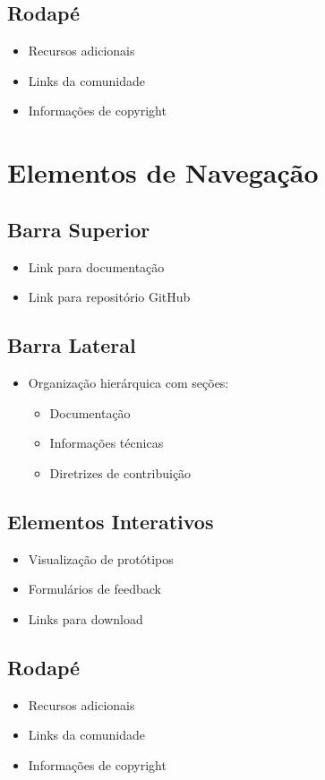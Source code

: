 \subsection{Rodapé}
\begin{itemize}
    \item Recursos adicionais
    \item Links da comunidade
    \item Informações de copyright
\end{itemize}

\section{Elementos de Navegação}

\subsection{Barra Superior}
\begin{itemize}
    \item Link para documentação
    \item Link para repositório GitHub
\end{itemize}

\subsection{Barra Lateral}
\begin{itemize}
    \item Organização hierárquica com seções:
    \begin{itemize}
        \item Documentação
        \item Informações técnicas
        \item Diretrizes de contribuição
    \end{itemize}
\end{itemize}

\subsection{Elementos Interativos}
\begin{itemize}
    \item Visualização de protótipos
    \item Formulários de feedback
    \item Links para download
\end{itemize}

\subsection{Rodapé}
\begin{itemize}
    \item Recursos adicionais
    \item Links da comunidade
    \item Informações de copyright
\end{itemize}



 
